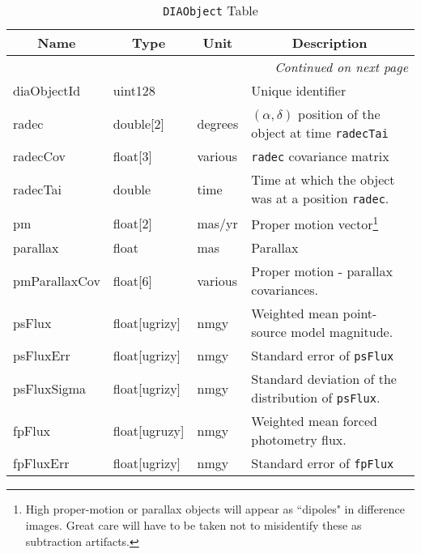 \documentclass[12pt]{article}
\newcommand{\code}[1]{\texttt{#1}}
\newcommand{\DIAObject}{\code{DIAObject}\xspace}
\begin{document}
\begin{center}
\begin{longtable}{p{3cm}p{2cm}p{2cm}p{5cm}}
\caption[\DIAObject Table]{\DIAObject Table} \\

\hline \multicolumn{1}{c}{\bf Name} & \multicolumn{1}{c}{\bf Type} & \multicolumn{1}{c}{\bf Unit} & \multicolumn{1}{c}{\bf Description} \\ \hline
\endhead

\hline \multicolumn{4}{r}{{\em Continued on next page}} \\
\endfoot

\hline\hline
\endlastfoot

diaObjectId & uint128 & ~ & Unique identifier \\ 

radec & double[2] & degrees & $(\alpha, \delta)$ position of the object at time \texttt{radecTai} \\ 

radecCov & float[3] & various & \texttt{radec} covariance matrix \\ 

radecTai & double & time & Time at which the object was at a position \texttt{radec}. \\ 

pm & float[2] & mas/yr & Proper motion vector\footnote{High proper-motion or parallax objects will appear as ``dipoles" in difference images. Great care will have to be taken not to misidentify these as subtraction artifacts.} \\ 

parallax & float & mas & Parallax \\ 

pmParallaxCov & float[6] & various & Proper motion - parallax covariances. \\ 

psFlux & float[ugrizy] & nmgy & Weighted mean point-source model magnitude. \\ 

psFluxErr & float[ugrizy] & nmgy & Standard error of {\tt psFlux}  \\ 

psFluxSigma & float[ugrizy] & nmgy & Standard deviation of the distribution of {\tt psFlux}. \\ 

fpFlux & float[ugruzy] & nmgy & Weighted mean forced photometry flux.\\

fpFluxErr & float[ugrizy] & nmgy & Standard error of {\tt fpFlux} \\ 


\end{longtable}
\end{center}
\end{document}
